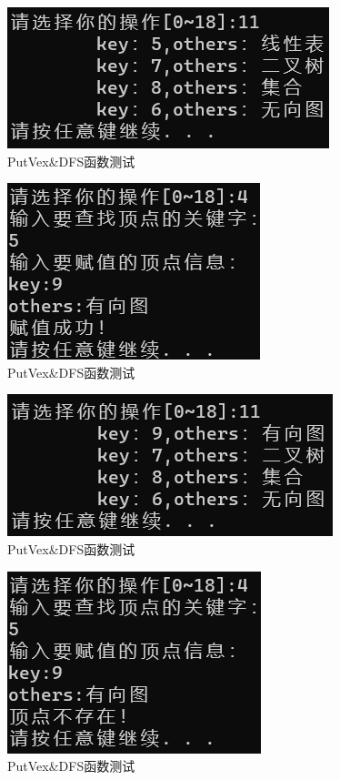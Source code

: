 \documentclass[supercite]{Experimental_Report}
\theoremstyle{definition}
\begin{document}
\begin{enumerate}
	
	\begin{figure}[H] %
		\begin{center}
			\includegraphics[width=0.5\linewidth]{images/graph/11.png}
			\caption{PutVex\&DFS函数测试}
			\label{fig2-4-1}
		\end{center}
	\end{figure}

	\begin{figure}[H] %
		\begin{center}
			\includegraphics[width=0.5\linewidth]{images/graph/4-1.png}
			\caption{PutVex\&DFS函数测试}
			\label{fig2-4-2}
		\end{center}
	\end{figure}
	
	\begin{figure}[H] %
		\begin{center}
			\includegraphics[width=0.5\linewidth]{images/graph/4-11.png}
			\caption{PutVex\&DFS函数测试}
			\label{fig2-4-3}
		\end{center}
	\end{figure}
	\begin{figure}[H] %
		\begin{center}
			\includegraphics[width=0.5\linewidth]{images/graph/4-2.png}
			\caption{PutVex\&DFS函数测试}
			\label{fig2-4-4}
		\end{center}
	\end{figure}
	

\end{enumerate}
\end{document}

